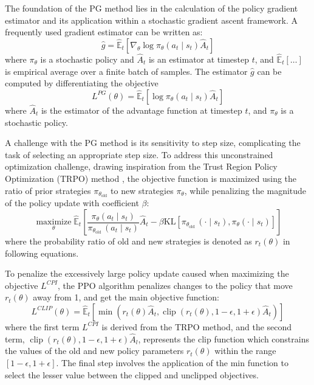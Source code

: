 The foundation of the PG method lies in the calculation of the policy gradient estimator and its application within a stochastic gradient ascent framework. A frequently used gradient estimator can be written as:
\begin{equation}
\hat{g}=\hat{\mathbb{E}}_t\left[\nabla_\theta \log \pi_\theta\left(a_t \mid s_t\right) \hat{A}_t\right]
\label{eq: function gradient estimator}
\end{equation}
where $\pi_\theta$ is a stochastic policy and $\hat{A}_t$ is an estimator at timestep $t$, and $\hat{\mathbb{E}}_t[\ldots]$ is empirical average over a finite batch of samples. The estimator $\hat{g}$ can be computed by differentiating the objective
\begin{equation}
L^{P G}(\theta)=\hat{\mathbb{E}}_t\left[\log \pi_\theta\left(a_t \mid s_t\right) \hat{A}_t\right]
\label{eq: PG objective}
\end{equation}
where $\hat{A}_t$ is the estimator of the advantage function at timestep $t$, and $\pi_\theta$ is a stochastic policy.

A challenge with the PG method is its sensitivity to step size, complicating the task of selecting an appropriate step size. To address this unconstrained optimization challenge, drawing inspiration from the Trust Region Policy Optimization (TRPO) method \parencite{schulman2015trust}, the objective function is maximized using the ratio of prior strategies $\pi_{\theta_{\text{old}}}$ to new strategies $\pi_{\theta}$, while penalizing the magnitude of the policy update with coefficient $\beta$:
\begin{equation}
\underset{\theta}{\operatorname{maximize}} 
 \hat{\mathbb{E}}_t\left[\frac{\pi_\theta\left(a_t \mid s_t\right)}{\pi_{\theta_{\text {old }}}\left(a_t \mid s_t\right)} \hat{A}_t - \beta \mathrm{KL}\left[\pi_{\theta_{\text {old }}}\left(\cdot \mid s_t\right), \pi_\theta\left(\cdot \mid s_t\right)\right]\right]
\label{eq: pg optimization problem}
\end{equation}
where the probability ratio of old and new strategies is denoted as $r_t(\theta)$ in following equations. 

To penalize the excessively large policy update caused when maximizing the objective $L^{CPI}$, the PPO algorithm penalizes changes to the policy that move $r_t(\theta)$ away from 1, and get the main objective function:
\begin{equation}
L^{CLIP}(\theta)=\hat{\mathbb{E}}_t\left[\min \left(r_t(\theta) \hat{A}_t, \operatorname{clip}\left(r_t(\theta), 1-\epsilon, 1+\epsilon\right) \hat{A}_t\right)\right]
\label{eq: PPO objective function}
\end{equation}
where the first term $L^{CPI}$ is derived from the TRPO method, and the second term, $\operatorname{clip}\left(r_t(\theta), 1-\epsilon, 1+\epsilon\right) \hat{A}_l$, represents the clip function which constrains the values of the old and new policy parameters $r_t(\theta)$ within the range $[1-\epsilon, 1+\epsilon]$. The final step involves the application of the min function to select the lesser value between the clipped and unclipped objectives.

